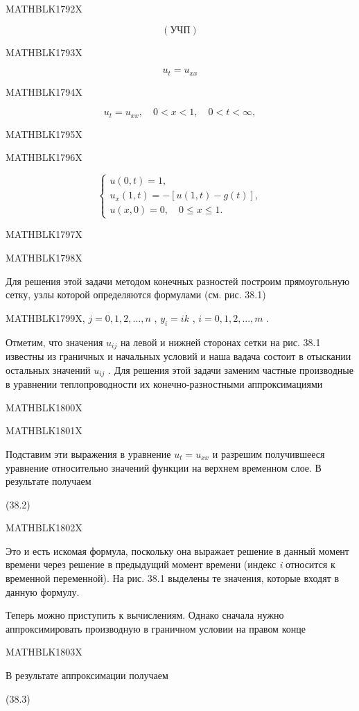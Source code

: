 \documentclass[
]{article}
\begin{document}
MATHBLK1792X

\[
(\text{УЧП})
\]

MATHBLK1793X

\[
u_t = u_{xx}
\]

MATHBLK1794X

\[
u_t = u_{xx}, \quad 0 < x < 1, \quad 0 < t < \infty,
\]

MATHBLK1795X

MATHBLK1796X

\[
\begin{cases} u(0, t) = 1, \\ u_x(1, t) = -[u(1, t) - g(t)], \\ u(x, 0) = 0, \quad 0 \le x \le 1. \end{cases}
\]

MATHBLK1797X

MATHBLK1798X

Для решения этой задачи методом конечных разностей построим
прямоугольную сетку, узлы которой определяются формулами (см. рис. 38.1)

MATHBLK1799X, \(j = 0, 1, 2, ..., n\) , \(y_i = ik\) ,
\(i = 0, 1, 2, ..., m\) .

Отметим, что значения \(u_{ij}\) на левой и нижней сторонах сетки на
рис. 38.1 известны из граничных и начальных условий и наша вадача
состоит в отыскании остальных значений \(u_{ij}\) . Для решения этой
задачи заменим частные производные в уравнении теплопроводности их
конечно-разностными аппроксимациями

MATHBLK1800X

MATHBLK1801X

Подставим эти выражения в уравнение \(u_t = u_{xx}\) и разрешим
получившееся уравнение относительно значений функции на верхнем
временном слое. В результате получаем

(38.2)

MATHBLK1802X

Это и есть искомая формула, поскольку она выражает решение в данный
момент времени через решение в предыдущий момент времени (индекс
\emph{i} относится к временной переменной). На рис. 38.1 выделены те
значения, которые входят в данную формулу.

Теперь можно приступить к вычислениям. Однако сначала нужно
аппроксимировать производную в граничном условии на правом конце

MATHBLK1803X

В результате аппроксимации получаем

(38.3)
\end{document}
